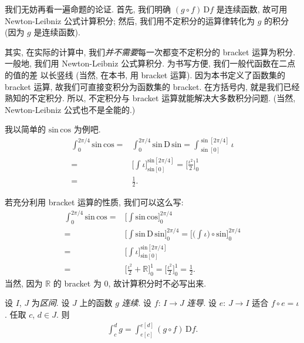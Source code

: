 我们无妨再看一遍命题的论证.
首先, 我们明确 $(g \circ f)\,\mathrm{D}f$ 是连续函数,
故可用 Newton-Leibniz 公式计算积分;
然后, 我们用不定积分的运算律转化为 $g$ 的积分
(因为 $g$ 是连续函数).

其实, 在实际的计算中,
我们\emph{并不需要}每一次都变不定积分的 bracket 运算为积分.
一般地, 我们用 Newton-Leibniz 公式算积分.
为书写方便, 我们一般代函数在二点的值的差
以长竖线 (当然, 在本书, 用 bracket 运算).
因为本书定义了函数集的 bracket 运算,
故我们可直接变积分为函数集的 bracket.
在方括号内, 就是我们已经熟知的不定积分.
所以, 不定积分与 bracket 运算就能解决大多数积分问题.
(当然, Newton-Leibniz 公式也不是全能的.)

\begin{example}
    我以简单的 $\mathrm{sin}\, \mathrm{cos}$ 为例吧.
    \begin{align*}
        \int_{0}^{2\pi/4} {\mathrm{sin}\,\mathrm{cos}}
        = {} & \int_{0}^{2\pi/4} {\mathrm{sin}\,\mathrm{D}\,\mathrm{sin}}
        = \int_{\sin[0]}^{\sin[2\pi/4]} {\iota}                                    \\
        = {} & \Bigg[ \int {\iota} \Bigg]_{\mathrm{sin}[0]}^{\mathrm{sin}[2\pi/4]}
        = \Bigg[ \frac{\iota^2}{2} \Bigg]_{0}^{1}                                  \\
        = {} & \frac{1}{2}.
    \end{align*}

    若充分利用 bracket 运算的性质, 我们可以这么写:
    \begin{align*}
        \int_{0}^{2\pi/4} {\mathrm{sin}\,\mathrm{cos}}
        = {} & \Bigg[ \int {\mathrm{sin}\,\mathrm{cos}} \Bigg]_{0}^{2\pi/4}             \\
        = {} & \Bigg[ \int {\mathrm{sin}\,\mathrm{D}\,\mathrm{sin}} \Bigg]_{0}^{2\pi/4}
        = \Bigg[ \Bigg( \int {\iota} \Bigg) \circ \mathrm{sin} \Bigg]_{0}^{2\pi/4}      \\
        = {} & \Bigg[ \int {\iota} \Bigg]_{\mathrm{sin}[0]}^{\mathrm{sin}[2\pi/4]}      \\
        = {} & \Bigg[ \frac{\iota^2}{2} + \mathbb{R} \Bigg]_{0}^{1}
        = \Bigg[ \frac{\iota^2}{2} \Bigg]_{0}^{1}
        = \frac{1}{2}.
    \end{align*}
    当然, 因为 $\mathbb{R}$ 的 bracket 为 $0$,
    故计算积分时不必写出来.
\end{example}

\begin{theorem}
    设 $I$, $J$ 为\emph{区间}.
    设 $J$ 上的函数 $g$ \emph{连续}.
    设 $f$: $I \to J$ \emph{连导}.
    设 $e$: $J \to I$ 适合 $f \circ e = \iota$.
    任取 $c$, $d \in J$.
    则
    \begin{align*}
        \int_{c}^{d} {g} = \int_{e[c]}^{e[d]} {(g \circ f)\,\mathrm{D}f}.
    \end{align*}
\end{theorem}

